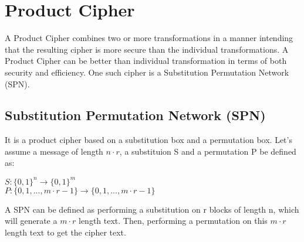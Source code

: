 \documentclass[11pt]{article}
\begin{document}
\section{Product Cipher}
A Product Cipher combines two or more transformations in a manner intending that the resulting cipher is more secure than the individual transformations. A Product Cipher can be better than individual transformation in terms of both security and efficiency. One such cipher is a Substitution Permutation Network (SPN).

\subsection{Substitution Permutation Network (SPN)}
It is a product cipher based on a substitution box and a permutation box. Let's assume a message of length $n \cdot r$, a substituion S and a permutation P be defined as:
\begin{center}
    $S: \{0, 1\}^n \rightarrow \{0, 1\}^m$\\
    $P: \{0, 1,..., m\cdot r - 1\} \rightarrow \{0, 1,..., m\cdot r - 1\} $
\end{center}

A SPN can be defined as performing a substitution on r blocks of length n, which will generate a $m \cdot r$ length text. Then, performing a permutation on this $m \cdot r$ length text to get the cipher text.
\end{document}
